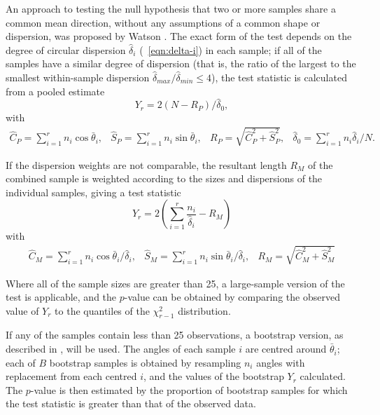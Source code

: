 \documentclass[../../ArchStats.tex]{subfiles}
\begin{document}
An approach to testing the null hypothesis that two or more samples share a common mean direction, without any assumptions of a common shape or dispersion, was proposed by Watson \cite{Watson1983}. The exact form of the test depends on the degree of circular dispersion $\hat{\delta}_i$ (~\ref{eqn:delta-i}) in each sample; if all of the samples have a similar degree of dispersion (that is, the ratio of the largest to the smallest within-sample dispersion $\hat{\delta}_{max} / \hat{\delta}_{min} \leq 4$), the test statistic is calculated from a pooled estimate
\begin{equation}
Y_r = 2(N - R_P) / \hat{\delta}_0,
\end{equation}
with
\begin{equation}
\begin{matrix*}
\hat{C}_P = \sum_{i=1}^r n_i \cos \bar{\theta}_i, &
\hat{S}_P = \sum_{i=1}^r n_i \sin \bar{\theta}_i, &
R_P = \sqrt{\hat{C}_P^2 + \hat{S}_P^2}, &
\hat{\delta}_0 = \sum_{i=1}^r n_i \hat{\delta}_i / N.
\end{matrix*}
\end{equation}


If the dispersion weights are not comparable, the resultant length $R_M$ of the combined sample is weighted according to the sizes and dispersions of the individual samples, giving a test statistic
\begin{equation}
Y_r = 2\left(\sum_{i=1}^r \frac{n_i}{\hat{\delta}_i} - R_M\right)
\end{equation}
with 
\begin{equation}
\begin{matrix*}
\hat{C}_M = \sum_{i=1}^r n_i \cos \bar{\theta}_i / \hat{\delta}_i, &
\hat{S}_M = \sum_{i=1}^r n_i \sin \bar{\theta}_i / \hat{\delta}_i, &
R_M = \sqrt{\hat{C}_M^2 + \hat{S}_M^2}
\end{matrix*}
\end{equation}

Where all of the sample sizes are greater than 25, a large-sample version of the test is applicable, and the $p$-value can be obtained by comparing the observed value of  $Y_r$ to the quantiles of the $\chi^2_{r-1}$ distribution. 

If any of the samples contain less than 25 observations, a bootstrap version, as described in \cite[section 8.4.4]{Fisher1993}, will be used. The angles of each sample $i$ are centred around $\bar{\theta}_i$; each of $B$ bootstrap samples is obtained by resampling $n_i$ angles with replacement from each centred $i$, and the values of the bootstrap $Y_r$ calculated. The $p$-value is then estimated by the proportion of bootstrap samples for which the test statistic is greater than that of the observed data.
\end{document}
